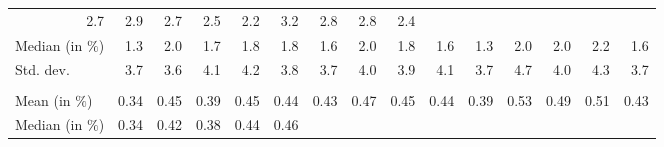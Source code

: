 \begin{tabular}{lllllllllllllll}
  \multicolumn{1}{r}{2.7} &
  \multicolumn{1}{r}{2.9} &
  \multicolumn{1}{r}{2.7} &
  \multicolumn{1}{r}{2.5} &
  \multicolumn{1}{r}{2.2} &
  \multicolumn{1}{r}{3.2} &
  \multicolumn{1}{r}{2.8} &
  \multicolumn{1}{r}{2.8} &
  \multicolumn{1}{r}{2.4} \\
\multicolumn{1}{l}{\hspace{2em}Median (in $\%$)} &
  \multicolumn{1}{|r}{1.3} &
  \multicolumn{1}{r}{2.0} &
  \multicolumn{1}{r}{1.7} &
  \multicolumn{1}{r}{1.8} &
  \multicolumn{1}{r}{1.8} &
  \multicolumn{1}{r}{1.6} &
  \multicolumn{1}{r}{2.0} &
  \multicolumn{1}{r}{1.8} &
  \multicolumn{1}{r}{1.6} &
  \multicolumn{1}{r}{1.3} &
  \multicolumn{1}{r}{2.0} &
  \multicolumn{1}{r}{2.0} &
  \multicolumn{1}{r}{2.2} &
  \multicolumn{1}{r}{1.6} \\
\multicolumn{1}{l}{\hspace{2em}Std. dev.} &
  \multicolumn{1}{|r}{3.7} &
  \multicolumn{1}{r}{3.6} &
  \multicolumn{1}{r}{4.1} &
  \multicolumn{1}{r}{4.2} &
  \multicolumn{1}{r}{3.8} &
  \multicolumn{1}{r}{3.7} &
  \multicolumn{1}{r}{4.0} &
  \multicolumn{1}{r}{3.9} &
  \multicolumn{1}{r}{4.1} &
  \multicolumn{1}{r}{3.7} &
  \multicolumn{1}{r}{4.7} &
  \multicolumn{1}{r}{4.0} &
  \multicolumn{1}{r}{4.3} &
  \multicolumn{1}{r}{3.7} \\
\multicolumn{1}{l}{\hspace{1em}{\textit{Elasticity} ($\widehat{\beta}$)}} &
  \multicolumn{1}{|r}{} &
  \multicolumn{1}{r}{} &
  \multicolumn{1}{r}{} &
  \multicolumn{1}{r}{} &
  \multicolumn{1}{r}{} &
  \multicolumn{1}{r}{} &
  \multicolumn{1}{r}{} &
  \multicolumn{1}{r}{} &
  \multicolumn{1}{r}{} &
  \multicolumn{1}{r}{} &
  \multicolumn{1}{r}{} &
  \multicolumn{1}{r}{} &
  \multicolumn{1}{r}{} &
  \multicolumn{1}{r}{} \\
\multicolumn{1}{l}{\hspace{2em}Mean (in $\%$)} &
  \multicolumn{1}{|r}{0.34} &
  \multicolumn{1}{r}{0.45} &
  \multicolumn{1}{r}{0.39} &
  \multicolumn{1}{r}{0.45} &
  \multicolumn{1}{r}{0.44} &
  \multicolumn{1}{r}{0.43} &
  \multicolumn{1}{r}{0.47} &
  \multicolumn{1}{r}{0.45} &
  \multicolumn{1}{r}{0.44} &
  \multicolumn{1}{r}{0.39} &
  \multicolumn{1}{r}{0.53} &
  \multicolumn{1}{r}{0.49} &
  \multicolumn{1}{r}{0.51} &
  \multicolumn{1}{r}{0.43} \\
\multicolumn{1}{l}{\hspace{2em}Median (in $\%$)} &
  \multicolumn{1}{|r}{0.34} &
  \multicolumn{1}{r}{0.42} &
  \multicolumn{1}{r}{0.38} &
  \multicolumn{1}{r}{0.44} &
  \multicolumn{1}{r}{0.46} &

\end{tabular}
